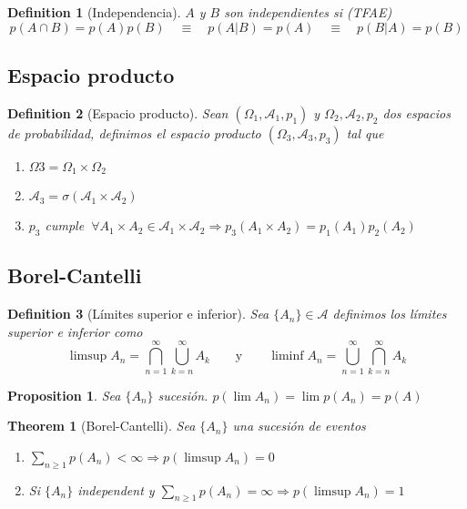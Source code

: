 \documentclass[leqno]{article}
\newtheorem*{theorem}{Theorem}
\newtheorem*{proposition}{Proposition}
\newtheorem*{definition}{Definition}
\begin{document}
\begin{definition}[Independencia] $A$ y  $B$ son independientes si (TFAE)
\[
  p(A\cap B) = p(A)p(B) \quad \equiv \quad p(A|B) = p(A) \quad \equiv \quad p(B|A) = p(B) 
\] 
\end{definition}
\subsection{Espacio producto}
\begin{definition}[Espacio producto] Sean $(\Omega_1, \mathcal{A}_1, p_1) $ y $\Omega _2, \mathcal{A}_2, p_2$ dos espacios de probabilidad, definimos el espacio producto $(\Omega _3, \mathcal{A}_3, p_3)$ tal que
  \begin{enumerate}[topsep=-6pt, itemsep=0pt]
    \item $\Omega 3 = \Omega _1 \times \Omega _2$
	\item $\mathcal{A}_3 = \sigma (\mathcal{A}_1\times \mathcal{A}_2)$
	\item $p_3$ cumple  $\ \forall A_1\times  A_2 \in \mathcal{A}_1\times \mathcal{A}_2 \Rightarrow p_3(A_1\times A_2)= p_1(A_1)p_2(A_2) $
  \end{enumerate}
\end{definition}

\subsection{Borel-Cantelli}
\begin{definition}[Límites superior e inferior] Sea $\{A_n\}\in \mathcal{A}$ definimos los límites superior e inferior como
  \[
  \limsup A_n =  \bigcap_{n=1}^\infty \bigcup_{k=n}^\infty A_k \qquad \text{y} \qquad 
  \liminf A_n =  \bigcup_{n=1}^\infty \bigcap_{k=n}^\infty A_k
  \] 
\end{definition}

\begin{proposition}
Sea $\{A_n\}$ sucesión.  $p(\lim A_n) = \lim p(A_n) = p(A)$ 
\end{proposition}
\begin{theorem}[Borel-Cantelli] Sea $\{A_n\}$ una sucesión de eventos
\begin{enumerate}[topsep=-6pt, itemsep=0pt]
  \item $\sum_{n\ge 1} p(A_n) < \infty \Rightarrow p(\limsup A_n) = 0 $ 
  \item Si $\{A_n\}$ independent y $\sum_{n\ge 1}p(A_n)=\infty \Rightarrow p(\limsup A_n)=1$
\end{enumerate}
\end{theorem}
\end{document}
